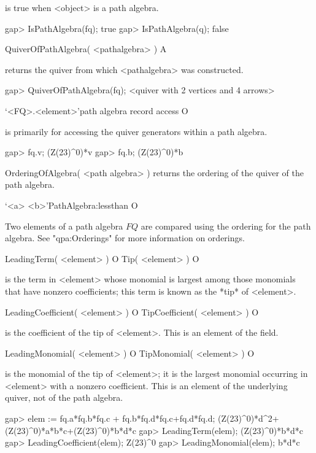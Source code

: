 is true when <object> is a path algebra.

\beginexample
gap> IsPathAlgebra(fq);
true
gap> IsPathAlgebra(q);
false
\endexample


\>QuiverOfPathAlgebra( <pathalgebra> ) A

returns the quiver from which <pathalgebra> was constructed.

\beginexample
gap> QuiverOfPathAlgebra(fq);
<quiver with 2 vertices and 4 arrows>
\endexample

\>`<FQ>.<element>'{path algebra record access} O

is primarily for accessing the quiver generators within a path algebra.

\beginexample
gap> fq.v;
(Z(23)^0)*v
gap> fq.b;
(Z(23)^0)*b
\endexample

\>OrderingOfAlgebra( <path algebra> )
returns the ordering of the quiver of the path algebra.

\>`<a> \< <b>'{PathAlgebra:lessthan} O

Two elements of a path algebra $FQ$ are compared
using the ordering for the path algebra.
See "qpa:Orderings" for more information on orderings.

\>LeadingTerm( <element> ) O
\>Tip( <element> ) O

is the term in <element> whose monomial is largest
among those monomials that have nonzero coefficients;
this term is known as the *tip* of <element>.

\>LeadingCoefficient( <element> ) O
\>TipCoefficient( <element> ) O

is the coefficient of the tip of <element>.
This is an element of the field.

\>LeadingMonomial( <element> ) O
\>TipMonomial( <element> ) O

is the monomial of the tip of <element>;
it is the largest monomial occurring in <element>
with a nonzero coefficient.
This is an element of the underlying quiver,
not of the path algebra.

\beginexample
gap> elem := fq.a*fq.b*fq.c + fq.b*fq.d*fq.c+fq.d*fq.d;
(Z(23)^0)*d^2+(Z(23)^0)*a*b*c+(Z(23)^0)*b*d*c
gap> LeadingTerm(elem);
(Z(23)^0)*b*d*c
gap> LeadingCoefficient(elem);
Z(23)^0
gap> LeadingMonomial(elem);
b*d*c
\endexample

